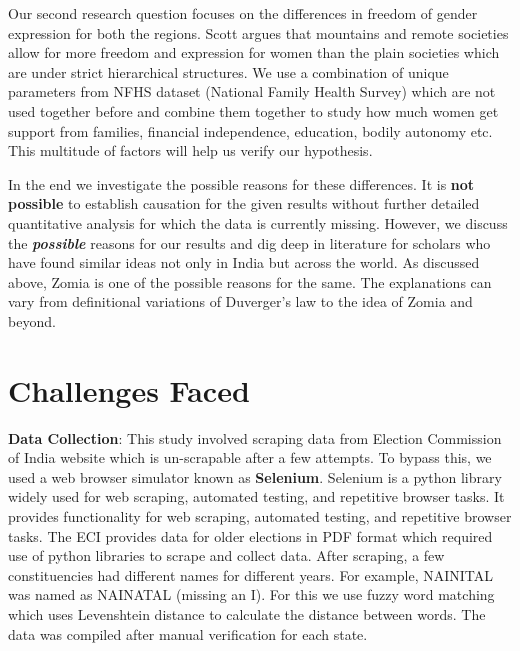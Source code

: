 \begin{sloppypar}
\vspace{0.2cm}

Our second research question focuses on the differences in freedom of gender expression for both the regions. Scott argues that mountains and remote societies allow for more freedom and expression for women than the plain societies which are under strict hierarchical structures. We use a combination of unique parameters from NFHS dataset (National Family Health Survey) which are not used together before and combine them together to study how much women get support from families, financial independence, education, bodily autonomy etc. This multitude of factors will help us verify our hypothesis.

\vspace{0.2cm}

In the end we investigate the possible reasons for these differences. It is \textbf{not possible} to establish causation for the given results without further detailed quantitative analysis for which the data is currently missing. However, we discuss the \textit{\textbf{possible}} reasons for our results and dig deep in literature for scholars who have found similar ideas not only in India but across the world. As discussed above, Zomia is one of the possible reasons for the same. The explanations can vary from definitional variations of Duverger's law to the idea of Zomia and beyond. 

\section{Challenges Faced}

\textbf{Data Collection}: This study involved scraping data from Election Commission of India \citep{ECI_WEBSITE} website which is un-scrapable after a few attempts. To bypass this, we used a web browser simulator known as \textbf{Selenium}. Selenium is a python library widely used for web scraping, automated testing, and repetitive browser tasks. It provides functionality for web scraping, automated testing, and repetitive browser tasks. The ECI provides data for older elections in PDF format which required use of python libraries to scrape and collect data. After scraping, a few constituencies had different names for different years. For example, NAINITAL was named as NAINATAL (missing an I). For this we use fuzzy word matching which uses Levenshtein distance to calculate the distance between words. The data was compiled after manual verification for each state.


\end{sloppypar}
